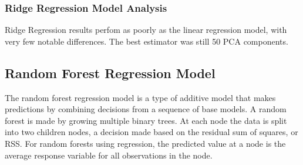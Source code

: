 \documentclass[11pt]{article}
\begin{document}

%

\hypertarget{ridge-regression-model-analysis}{%
	\subsubsection{Ridge Regression Model
		Analysis}\label{ridge-regression-model-analysis}}

Ridge Regression results perfom as poorly as the linear regression
model, with very few notable differences. The best estimator was still
50 PCA components.

\hypertarget{random-forest-regression-model}{%
	\subsection{Random Forest Regression Model
	}\label{random-forest-regression-model-}}

The random forest regression model is a type of additive model that makes predictions by combining decisions from a sequence of base models. A random forest is made by growing multiple binary trees. At each node the data is split into two children nodes, a decision made based on the residual sum of squares, or RSS. For random forests using regression, the predicted value at a node is the average response variable for all observations in the node.


%
%
%
\end{document}
